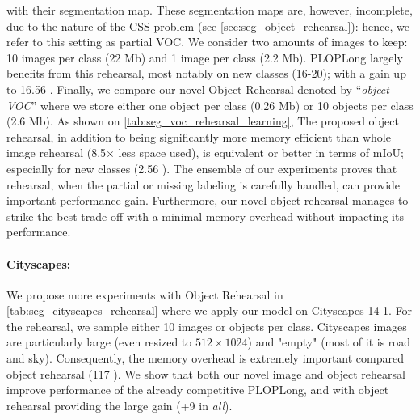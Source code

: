 with their segmentation map. These segmentation maps are, however, incomplete, due to the nature of
the \ac{CSS} problem (see \autoref{sec:seg_object_rehearsal}): hence, we refer to this setting as
partial VOC. We consider two amounts of images to keep: 10 images per class (22 Mb) and 1 image per
class (2.2 Mb). PLOPLong largely benefits from this rehearsal, most notably on new classes (16-20);
with a gain up to 16.56 \pp. Finally, we compare our novel Object Rehearsal denoted by
``\textit{object VOC}'' where we store either one object per class (0.26 Mb) or 10 objects per class
(2.6 Mb). As shown on \autoref{tab:seg_voc_rehearsal_learning}, The proposed object rehearsal, in
addition to being significantly more memory efficient than whole image rehearsal (8.5$\times$ less
space used), is equivalent or better in terms of \ac{mIoU}; especially for new classes (2.56 \pp).
The ensemble of our experiments proves that rehearsal, when the partial or missing labeling is
carefully handled, can provide important performance gain. Furthermore, our novel object rehearsal
manages to strike the best trade-off with a minimal memory overhead without impacting its
performance.

\paragraph{Cityscapes:} We propose more experiments with Object Rehearsal in
\autoref{tab:seg_cityscapes_rehearsal} where we apply our model on Cityscapes 14-1. For the
rehearsal, we sample either 10 images or objects per class. Cityscapes images are particularly large
(even resized to $512 \times 1024$)  and "empty" (most of it is road and sky). Consequently, the
memory overhead is extremely important compared object rehearsal (117 ). We show that both
our novel image and object rehearsal improve performance of the already competitive PLOPLong, and
with object rehearsal providing the large gain (+9 \pp in \textit{all}).

